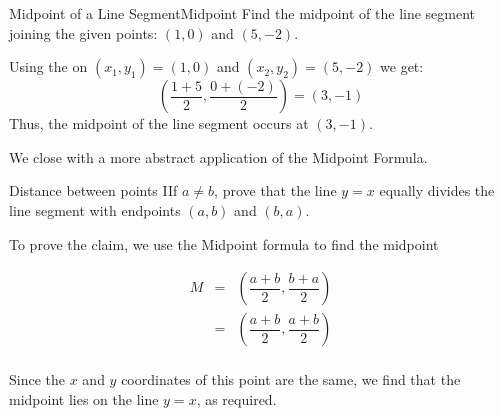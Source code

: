 \bigskip

\begin{example}{Midpoint of a Line Segment}{Midpoint}
Find the midpoint of the line segment joining the given points: $(1,0)$ and $(5,-2)$.
\end{example}

\begin{solution} 
Using the  on $(x_1,y_1)=(1,0)$ and $(x_2,y_2)=(5,-2)$ we get:
$$\left(\frac{1+5}{2},\frac{0+(-2)}{2}\right)=(3,-1)$$
Thus, the midpoint of the line segment occurs at $(3,-1)$.
\end{solution}


We close with a more abstract application of the Midpoint Formula. 

\begin{example}{Distance between points}
IIf $a \neq b$, prove that the line $y = x$ equally divides the line segment with endpoints $(a,b)$ and $(b,a)$.
\end{example}	
\begin{solution}	
To prove the claim, we use the Midpoint formula to find the midpoint  
	
	\[ \begin{array}{rcl}
	
	M & = & \left( \dfrac{a+b}{2},  \dfrac{b+a}{2} \right) \\
	& = & \left( \dfrac{a+b}{2},  \dfrac{a+b}{2} \right)  \\ \end{array} \]
	
	Since the $x$ and $y$ coordinates of this point are the same, we find that the midpoint lies on the line $y=x$, as required. \
\end{solution}
	



